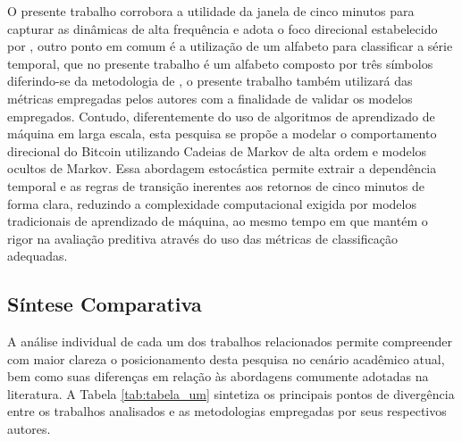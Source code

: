 \documentclass[
    12pt,                %
    openright,           %
    oneside,             %
    a4paper,             %
    english,             %
    brazil               %
]{abntex2}
\begin{document}
O presente trabalho corrobora a utilidade da janela de cinco minutos para capturar as dinâmicas de alta frequência e adota o foco direcional estabelecido por , outro ponto em comum é a utilização de um alfabeto para classificar a série temporal, que no presente trabalho é um alfabeto composto por três símbolos diferindo-se da metodologia de , o presente trabalho também utilizará das métricas empregadas pelos autores com a finalidade de validar os modelos empregados. Contudo, diferentemente do uso de algoritmos de aprendizado de máquina em larga escala, esta pesquisa se propõe a modelar o comportamento direcional do Bitcoin utilizando Cadeias de Markov de alta ordem e modelos ocultos de Markov. Essa abordagem estocástica permite extrair a dependência temporal e as regras de transição inerentes aos retornos de cinco minutos de forma clara, reduzindo a complexidade computacional exigida por modelos tradicionais de aprendizado de máquina, ao mesmo tempo em que mantém o rigor na avaliação preditiva através do uso das métricas de classificação adequadas. 

\subsection{Síntese Comparativa}

A análise individual de cada um dos trabalhos relacionados permite compreender com maior clareza o posicionamento desta pesquisa no cenário acadêmico atual, bem como suas diferenças em relação às abordagens comumente adotadas na literatura. A Tabela \ref{tab:tabela_um} sintetiza os principais pontos de divergência entre os trabalhos analisados e as metodologias empregadas por seus respectivos autores.
\end{document}
